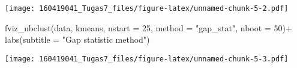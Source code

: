 \documentclass[
]{article}
\newenvironment{Shaded}{\begin{snugshade}}{\end{snugshade}}
\newcommand{\AttributeTok}[1]{\textcolor[rgb]{0.77,0.63,0.00}{#1}}
\newcommand{\DecValTok}[1]{\textcolor[rgb]{0.00,0.00,0.81}{#1}}
\newcommand{\FunctionTok}[1]{\textcolor[rgb]{0.00,0.00,0.00}{#1}}
\newcommand{\NormalTok}[1]{#1}
\newcommand{\SpecialCharTok}[1]{\textcolor[rgb]{0.00,0.00,0.00}{#1}}
\newcommand{\StringTok}[1]{\textcolor[rgb]{0.31,0.60,0.02}{#1}}
\begin{document}
\texttt{[image: 160419041\_Tugas7\_files/figure-latex/unnamed-chunk-5-2.pdf]}

\begin{Shaded}
\begin{Highlighting}[]
\FunctionTok{fviz\_nbclust}\NormalTok{(data, kmeans, }\AttributeTok{nstart =} \DecValTok{25}\NormalTok{,  }\AttributeTok{method =} \StringTok{"gap\_stat"}\NormalTok{, }\AttributeTok{nboot =} \DecValTok{50}\NormalTok{)}\SpecialCharTok{+}
  \FunctionTok{labs}\NormalTok{(}\AttributeTok{subtitle =} \StringTok{"Gap statistic method"}\NormalTok{)}
\end{Highlighting}
\end{Shaded}

\texttt{[image: 160419041\_Tugas7\_files/figure-latex/unnamed-chunk-5-3.pdf]}
\end{document}
